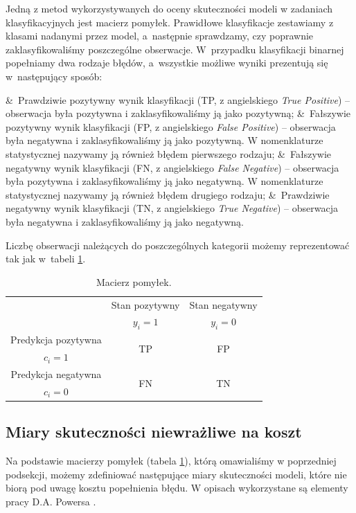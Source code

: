 \documentclass[inzynierska]{pwr_wmat_praca_dyplomowa}
\theoremstyle{plain}
\numberwithin{theorem}{chapter}
\theoremstyle{definition}
\numberwithin{theorem}{chapter}
\begin{document}
Jedną z metod wykorzystywanych do oceny skuteczności modeli w zadaniach klasyfikacyjnych jest macierz pomyłek. Prawidłowe klasyfikacje zestawiamy z klasami nadanymi przez model, a~następnie sprawdzamy, czy poprawnie zaklasyfikowaliśmy poszczególne obserwacje. W~przypadku klasyfikacji binarnej popełniamy dwa rodzaje błędów, a~wszystkie możliwe wyniki prezentują się w~następujący sposób:
\begin{myitemize}
	& \,Prawdziwie pozytywny wynik klasyfikacji (TP, z angielskiego \textit{True Positive}) -- obserwacja była pozytywna i zaklasyfikowaliśmy ją jako pozytywną;
	& \,Fałszywie pozytywny wynik klasyfikacji (FP, z angielskiego \textit{False Positive}) -- obserwacja była negatywna i zaklasyfikowaliśmy ją jako pozytywną. W nomenklaturze statystycznej nazywamy ją również błędem pierwszego rodzaju;
	& \,Fałszywie negatywny wynik klasyfikacji (FN, z angielskiego \textit{False Negative}) -- obserwacja była pozytywna i zaklasyfikowaliśmy ją jako negatywną. W nomenklaturze statystycznej nazywamy ją również błędem drugiego rodzaju;
	& \,Prawdziwie negatywny wynik klasyfikacji (TN, z angielskiego \textit{True Negative}) -- obserwacja była negatywna i zaklasyfikowaliśmy ją jako negatywną.
\end{myitemize}
\noindent Liczbę obserwacji należących do poszczególnych kategorii możemy reprezentować tak jak w~tabeli \ref{tab:macierz-pomylek}.
\begin{table}[h]
	\begin{center}
		\begin{tabular}{c|c|c}
			 \multirow{2}{4em}{} & Stan pozytywny & Stan negatywny \\
			                  & $y_i = 1$            & $y_i = 0$ \\
			 \hline
			  Predykcja pozytywna & \multirow{2}{4em}{\centering TP} & \multirow{2}{4em}{\centering FP} \\
			    $c_i = 1$         &                    &                    \\
			 \hline
			 Predykcja negatywna & \multirow{2}{4em}{\centering FN} & \multirow{2}{4em}{\centering TN} \\
			   $c_i = 0$         &                    &                    \\
		\end{tabular}
	\end{center}
	\caption{Macierz pomyłek.}
	\label{tab:macierz-pomylek}
\end{table}

\subsection{Miary skuteczności niewrażliwe na koszt}
Na podstawie macierzy pomyłek (tabela \ref{tab:macierz-pomylek}), którą omawialiśmy w poprzedniej podsekcji, możemy zdefiniować następujące miary skuteczności modeli, które nie biorą pod uwagę kosztu popełnienia błędu. W opisach wykorzystane są elementy pracy D.A. Powersa \cite{evaluation_metrics}.
\end{document}
